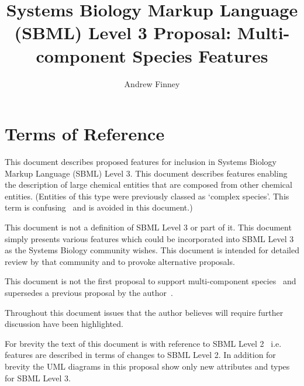 \documentclass{cekarticle}
\begin{document}

\title{Systems Biology Markup Language (SBML) Level 3 Proposal: Multi-component Species Features}

\author{Andrew Finney}


\maketitlepage


\section{Terms of Reference}
\label{sec:t-o-r}

This document describes proposed features for inclusion in Systems
Biology Markup Language (SBML) Level 3. This document describes
features enabling the description of large chemical entities that
are composed from other chemical entities.  (Entities of this type
were previously classed as `complex species'. This term is
confusing~\citep{phair:2003} and is avoided in this document.)

This document is not a definition of SBML Level 3 or part of it.
This document simply presents various features which could be
incorporated into SBML Level 3 as the Systems Biology community
wishes.  This document is intended for detailed review by that
community and to provoke alternative proposals.

This document is not the first proposal to support multi-component species~\citep{lenovere:2002}
and supersedes a previous proposal by the author~\citep{finney:2001f}.

Throughout this
document issues that the author believes will require further
discussion have been highlighted.

For brevity the text of this document is with reference to SBML
Level 2~\citep{finney:2002f} i.e. features are described in terms
of changes to SBML Level 2.  In addition for brevity the UML diagrams in this proposal
show only new attributes and types for SBML Level 3.
\end{document}
